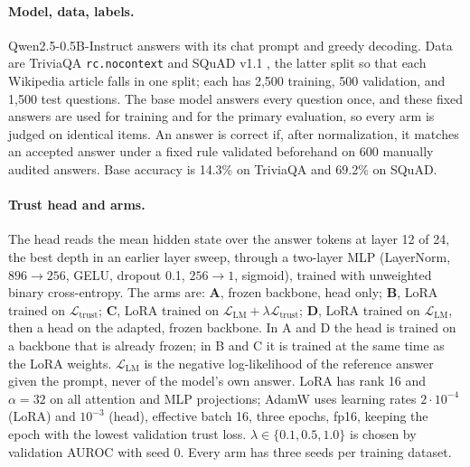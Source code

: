 \documentclass[11pt]{article}
\newcommand{\Ltrust}{\mathcal{L}_{\text{trust}}}
\newcommand{\LLM}{\mathcal{L}_{\text{LM}}}
\begin{document}
\paragraph{Model, data, labels.} Qwen2.5-0.5B-Instruct \citep{qwen2024qwen25} answers with its chat prompt and greedy decoding. Data are TriviaQA \texttt{rc.nocontext} \citep{joshi-etal-2017-triviaqa} and SQuAD v1.1 \citep{rajpurkar-etal-2016-squad}, the latter split so that each Wikipedia article falls in one split; each has 2,500 training, 500 validation, and 1,500 test questions. The base model answers every question once, and these fixed answers are used for training and for the primary evaluation, so every arm is judged on identical items. An answer is correct if, after normalization, it matches an accepted answer under a fixed rule validated beforehand on 600 manually audited answers. Base accuracy is 14.3\% on TriviaQA and 69.2\% on SQuAD.

\paragraph{Trust head and arms.} The head reads the mean hidden state over the answer tokens at layer 12 of 24, the best depth in an earlier layer sweep, through a two-layer MLP (LayerNorm, $896\!\to\!256$, GELU, dropout 0.1, $256\!\to\!1$, sigmoid), trained with unweighted binary cross-entropy. The arms are: \textbf{A}, frozen backbone, head only; \textbf{B}, LoRA trained on $\Ltrust$; \textbf{C}, LoRA trained on $\LLM + \lambda\Ltrust$; \textbf{D}, LoRA trained on $\LLM$, then a head on the adapted, frozen backbone. In A and D the head is trained on a backbone that is already frozen; in B and C it is trained at the same time as the LoRA weights. $\LLM$ is the negative log-likelihood of the reference answer given the prompt, never of the model's own answer. LoRA \citep{hu2022lora} has rank 16 and $\alpha=32$ on all attention and MLP projections; AdamW uses learning rates $2\cdot10^{-4}$ (LoRA) and $10^{-3}$ (head), effective batch 16, three epochs, fp16, keeping the epoch with the lowest validation trust loss. $\lambda\in\{0.1, 0.5, 1.0\}$ is chosen by validation AUROC with seed 0. Every arm has three seeds per training dataset.
\end{document}
